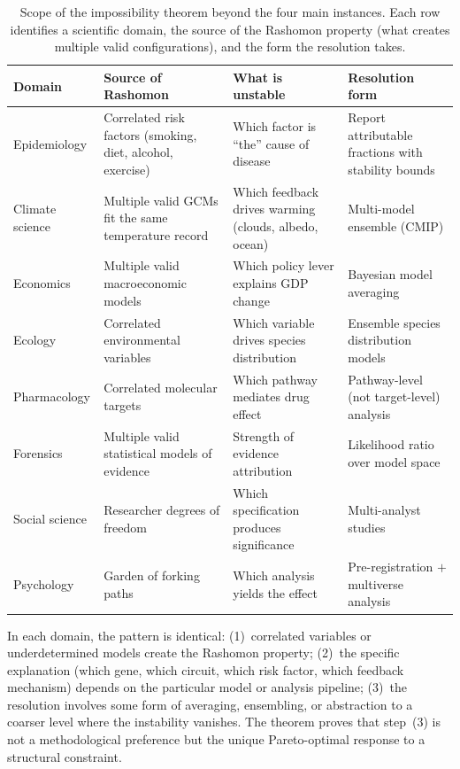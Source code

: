 \documentclass[11pt,a4paper]{article}
\begin{document}
\begin{table}[h]
\centering
\small
\caption{Scope of the impossibility theorem beyond the four main instances.  Each row identifies a scientific domain, the source of the Rashomon property (what creates multiple valid configurations), and the form the resolution takes.}
\label{tab:scope}
\begin{tabular}{@{}p{2.5cm}p{4cm}p{4cm}p{3cm}@{}}
\toprule
\textbf{Domain} & \textbf{Source of Rashomon} & \textbf{What is unstable} & \textbf{Resolution form} \\
\midrule
Epidemiology & Correlated risk factors (smoking, diet, alcohol, exercise) & Which factor is ``the'' cause of disease & Report attributable fractions with stability bounds \\[4pt]
Climate science & Multiple valid GCMs fit the same temperature record & Which feedback drives warming (clouds, albedo, ocean) & Multi-model ensemble (CMIP) \\[4pt]
Economics & Multiple valid macroeconomic models & Which policy lever explains GDP change & Bayesian model averaging \\[4pt]
Ecology & Correlated environmental variables & Which variable drives species distribution & Ensemble species distribution models \\[4pt]
Pharmacology & Correlated molecular targets & Which pathway mediates drug effect & Pathway-level (not target-level) analysis \\[4pt]
Forensics & Multiple valid statistical models of evidence & Strength of evidence attribution & Likelihood ratio over model space \\[4pt]
Social science & Researcher degrees of freedom & Which specification produces significance & Multi-analyst studies \\[4pt]
Psychology & Garden of forking paths & Which analysis yields the effect & Pre-registration $+$ multiverse analysis \\
\bottomrule
\end{tabular}
\end{table}

In each domain, the pattern is identical: (1)~correlated variables or underdetermined models create the Rashomon property; (2)~the specific explanation (which gene, which circuit, which risk factor, which feedback mechanism) depends on the particular model or analysis pipeline; (3)~the resolution involves some form of averaging, ensembling, or abstraction to a coarser level where the instability vanishes.  The theorem proves that step~(3) is not a methodological preference but the unique Pareto-optimal response to a structural constraint.
\end{document}
